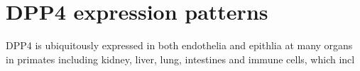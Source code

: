 \section{DPP4 expression patterns}
DPP4 is ubiquitously expressed in both endothelia and epithlia at many organs in primates including kidney, liver, lung, intestines and immune cells, which incl